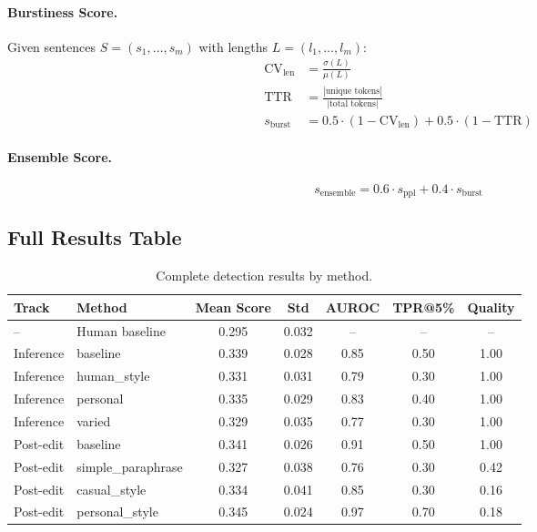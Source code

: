 \paragraph{Burstiness Score.}
Given sentences $S = (s_1, \ldots, s_m)$ with lengths $L = (l_1, \ldots, l_m)$:
\begin{align}
    \text{CV}_{\text{len}} &= \frac{\sigma(L)}{\mu(L)} \\
    \text{TTR} &= \frac{|\text{unique tokens}|}{|\text{total tokens}|} \\
    s_{\text{burst}} &= 0.5 \cdot (1 - \text{CV}_{\text{len}}) + 0.5 \cdot (1 - \text{TTR})
\end{align}

\paragraph{Ensemble Score.}
\begin{equation}
    s_{\text{ensemble}} = 0.6 \cdot s_{\text{ppl}} + 0.4 \cdot s_{\text{burst}}
\end{equation}

\subsection{Full Results Table}

\begin{table}[h]
\centering
\caption{Complete detection results by method.}
\label{tab:full_results}
\small
\begin{tabular}{@{}llccccc@{}}
\toprule
\textbf{Track} & \textbf{Method} & \textbf{Mean Score} & \textbf{Std} & \textbf{AUROC} & \textbf{TPR@5\%} & \textbf{Quality} \\
\midrule
-- & Human baseline & 0.295 & 0.032 & -- & -- & -- \\
\midrule
Inference & baseline & 0.339 & 0.028 & 0.85 & 0.50 & 1.00 \\
Inference & human\_style & 0.331 & 0.031 & 0.79 & 0.30 & 1.00 \\
Inference & personal & 0.335 & 0.029 & 0.83 & 0.40 & 1.00 \\
Inference & varied & 0.329 & 0.035 & 0.77 & 0.30 & 1.00 \\
\midrule
Post-edit & baseline & 0.341 & 0.026 & 0.91 & 0.50 & 1.00 \\
Post-edit & simple\_paraphrase & 0.327 & 0.038 & 0.76 & 0.30 & 0.42 \\
Post-edit & casual\_style & 0.334 & 0.041 & 0.85 & 0.30 & 0.16 \\
Post-edit & personal\_style & 0.345 & 0.024 & 0.97 & 0.70 & 0.18 \\
\bottomrule
\end{tabular}
\end{table}
